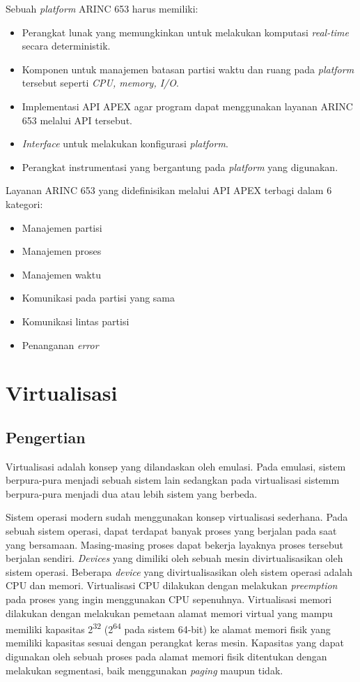 Sebuah \textit{platform} ARINC 653 harus memiliki:
\begin{itemize}
    \item Perangkat lunak yang memungkinkan untuk melakukan komputasi \textit{real-time} secara deterministik.
    \item Komponen untuk manajemen batasan partisi waktu dan ruang pada \textit{platform} tersebut seperti
        \textit{CPU, memory, I/O}.
    \item Implementasi API APEX agar program dapat menggunakan layanan ARINC 653 melalui API tersebut.
    \item \textit{Interface} untuk melakukan konfigurasi \textit{platform}.
    \item Perangkat instrumentasi yang bergantung pada \textit{platform} yang digunakan.
\end{itemize}

Layanan ARINC 653 yang didefinisikan melalui API APEX terbagi dalam 6 kategori:
\begin{itemize}
    \item Manajemen partisi
    \item Manajemen proses
    \item Manajemen waktu
    \item Komunikasi pada partisi yang sama
    \item Komunikasi lintas partisi
    \item Penanganan \textit{error}
\end{itemize}


\section{Virtualisasi}

\subsection{Pengertian}

Virtualisasi adalah konsep yang dilandaskan oleh emulasi. Pada emulasi, sistem berpura-pura menjadi sebuah sistem lain
sedangkan pada virtualisasi sistemm berpura-pura menjadi dua atau lebih sistem yang berbeda.

Sistem operasi modern sudah menggunakan konsep virtualisasi sederhana. Pada sebuah sistem operasi, dapat terdapat banyak
proses yang berjalan pada saat yang bersamaan. Masing-masing proses dapat bekerja layaknya proses tersebut berjalan
sendiri. \textit{Devices} yang dimiliki oleh sebuah mesin divirtualisasikan oleh sistem operasi. Beberapa
\textit{device} yang divirtualisasikan oleh sistem operasi adalah CPU dan memori. Virtualisasi CPU dilakukan dengan
melakukan \textit{preemption} pada proses yang ingin menggunakan CPU sepenuhnya. Virtualisasi memori dilakukan dengan
melakukan pemetaan alamat memori virtual yang mampu memiliki kapasitas 2\textsuperscript{32} (2\textsuperscript{64} pada
sistem 64-bit) ke alamat memori fisik yang memiliki kapasitas sesuai dengan perangkat keras mesin.  Kapasitas yang dapat
digunakan oleh sebuah proses pada alamat memori fisik ditentukan dengan melakukan segmentasi, baik menggunakan
\textit{paging} maupun tidak.

